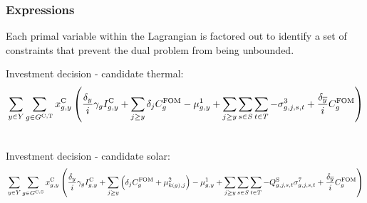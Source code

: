 \documentclass{article}
\begin{document}
\subsubsection{Expressions}
Each primal variable within the Lagrangian is factored out to identify a set of constraints that prevent the dual problem from being unbounded.

\newcommand{\sumIntervals}{\sum\limits_{\iYear \in \sYears}\sum\limits_{\iScenario \in \sScenarios} \sum\limits_{\iInterval \in \sIntervals}}

Investment decision - candidate thermal:
\begin{align}
	& \sum\limits_{\iYear \in \sYears} \sum\limits_{\iGenerator \in \sGeneratorsCandidateThermal} \vInstalledCapacity \left(\frac{\cDiscountRate}{\cInterestRate} \cAmortisationRate \cCandidateInvestmentCost + \sum\limits_{\iYearAlias \geq \iYear} \cDiscountRate[\iYearAlias] \cFixedOperationsMaintenanceCostGenerator - \dNonNegativeCandidateCapacity + \sum\limits_{\iYearAlias \geq \iYear} \sum\limits_{\iScenario \in \sScenarios} \sum\limits_{\iInterval \in \sIntervals} - \dMaxPowerOutputCandidateThermal[\iGenerator,\iYearAlias,\iScenario,\iInterval] + \frac{\cDiscountRate[\iYearTerminal]}{\cInterestRate}\cFixedOperationsMaintenanceCostGenerator\right)\\\nonumber
\end{align}

Investment decision - candidate solar:
\begin{align}
& \sum\limits_{\iYear \in \sYears} \sum\limits_{\iGenerator \in \sGeneratorsCandidateSolar} \vInstalledCapacity \left(\frac{\cDiscountRate}{\cInterestRate} \cAmortisationRate \cCandidateInvestmentCost + \sum\limits_{\iYearAlias \geq \iYear} \left(\cDiscountRate[\iYearAlias] \cFixedOperationsMaintenanceCostGenerator + \dSolarBuildLimit[k(\iGenerator), \iYearAlias] \right) - \dNonNegativeCandidateCapacity 
+ \sum\limits_{\iYearAlias \geq \iYear} \sum\limits_{\iScenario \in \sScenarios} \sum\limits_{\iInterval \in \sIntervals} - \cCapacityFactorSolar[\iGenerator,\iYearAlias,\iScenario,\iInterval] \dMaxPowerOutputSolarCandidate[\iGenerator,\iYearAlias,\iScenario,\iInterval] + \frac{\cDiscountRate[\iYearTerminal]}{\cInterestRate}\cFixedOperationsMaintenanceCostGenerator\right)\\\nonumber
\end{align}
\end{document}
